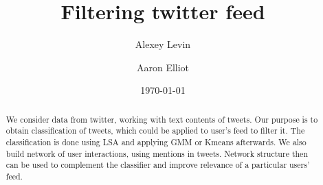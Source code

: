 \documentclass[%
 reprint,
 amsmath,amssymb,
 aps,
]{revtex4-1}
\begin{document}

\title{Filtering twitter feed}%

\author{Alexey Levin}
\author{Aaron Elliot}%
%




\date{\today}%

\begin{abstract}


We consider data from twitter, working with text contents of tweets.
Our purpose is to obtain classification of tweets, which could be applied to user's feed to filter it.
The classification is done using LSA and applying GMM or Kmeans afterwards.
We also build network of user interactions, using mentions in tweets. Network structure then can be used to complement the classifier and improve relevance of a particular users' feed.



\end{abstract}
\end{document}
